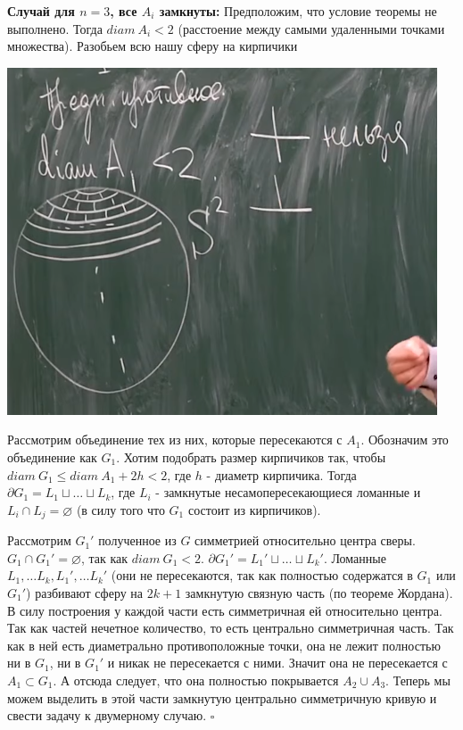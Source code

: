\par \textbf{Случай для $n=3$, все $A_i$ замкнуты:} Предположим, что условие теоремы не выполнено. Тогда $diam \: A_i < 2$ (расстоение между самыми удаленными точками множества). Разобьем всю нашу сферу на кирпичики
\begin{center}
    \includegraphics[scale=0.5]{images/dima_s2.png}
\end{center}

\par Рассмотрим объединение тех из них, которые пересекаются с $A_1$. Обозначим это объединение как $G_1$. Хотим подобрать размер кирпичиков так, чтобы $diam \: G_1 \leq diam \: A_1 + 2h < 2$, где $h$ - диаметр кирпичика. Тогда $\partial G_1=L_1\sqcup \ldots \sqcup L_k$, где $L_i$ - замкнутые несамопересекающиеся ломанные и $L_i \cap L_j=\varnothing$ (в силу того что $G_1$ состоит из кирпичиков). 

\par Рассмотрим $G_1'$ полученное из $G$ симметрией относительно центра сверы. $G_1 \cap G_1'=\varnothing$, так как $diam \: G_1 < 2$. $\partial G_1'=L_1' \sqcup \ldots \sqcup L_k'$. Ломанные $L_1, \ldots L_k, L_1', \ldots L_k'$ (они не пересекаются, так как полностью содержатся в $G_1$ или $G_1'$) разбивают сферу на $2k+1$ замкнутую связную часть (по теореме Жордана). В силу построения у каждой части есть симметричная ей относительно центра. Так как частей нечетное количество, то есть центрально симметричная часть. Так как в ней есть диаметрально противоположные точки, она не лежит полностью ни в $G_1$, ни в $G_1'$ и никак не пересекается с ними. Значит она не пересекается с $A_1 \subset G_1$. А отсюда следует, что она полностью покрывается $A_2 \cup A_3$. Теперь мы можем выделить в этой части замкнутую центрально симметричную кривую и свести задачу к двумерному случаю. $\square$